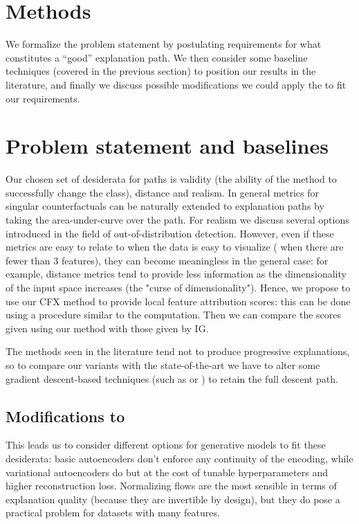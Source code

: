 \documentclass[../main.tex]{subfiles}
\begin{document}
\section{Methods}

We formalize the problem statement by postulating requirements for what constitutes a ``good'' explanation path.
We then consider some baseline techniques (covered in the previous section) to position our results in the literature, and finally we discuss possible modifications we could apply the \ls{} to fit our requirements.

\section{Problem statement and baselines}

Our chosen set of desiderata for paths is validity (the ability of the method to successfully change the class), distance and realism. In general metrics for singular counterfactuals can be naturally extended to explanation paths by taking the area-under-curve over the path.
For realism we discuss several options introduced in the field of out-of-distribution detection.
However, even if these metrics are easy to relate to when the data is easy to visualize (\ie{} when there are fewer than 3 features), they can become meaningless in the general case: for example, distance metrics tend to provide less information as the dimensionality of the input space increases (the "curse of dimensionality").
Hence, we propose to use our CFX method to provide local feature attribution scores: this can be done using a procedure similar to the  computation. Then we can compare the scores given using our method with those given by IG.

The methods seen in the literature tend not to produce progressive explanations, so to compare our \ls{} variants with the state-of-the-art we have to alter some gradient descent-based techniques (such as \cite{joshiRealistic2019} or \cite{wachterCounterfactual2017}) to retain the full descent path.

\subsection{Modifications to \ls{}}

This leads us to consider different options for generative models to fit these desiderata: basic autoencoders don't enforce any continuity of the encoding, while variational autoencoders do but at the cost of tunable hyperparameters and higher reconstruction loss.
Normalizing flows are the most sensible in terms of explanation quality (because they are invertible by design), but they do pose a practical problem for datasets with many features.
\end{document}
